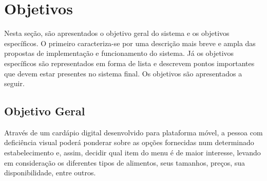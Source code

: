 \chapter{\label{chap:objet}Objetivos}

Nesta seção, são apresentados o objetivo geral do sistema e os objetivos específicos. O primeiro caracteriza-se por uma descrição mais breve e ampla das propostas de implementação e funcionamento do sistema. Já os objetivos específicos são representados em forma de lista e descrevem pontos importantes que devem estar presentes no sistema final. Os objetivos são apresentados a seguir.

\section{Objetivo Geral}
Através de um cardápio digital desenvolvido para plataforma móvel, a pessoa com deficiência visual poderá ponderar sobre as opções fornecidas num determinado estabelecimento e, assim, decidir qual item do menu é de maior interesse, levando em consideração os diferentes tipos de alimentos, seus tamanhos, preços, sua disponibilidade, entre outros. 

